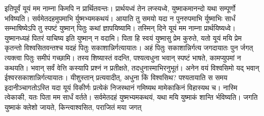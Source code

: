 \vakya इतिपूर्वं यूयं मम नाम्ना किमपि न प्रार्थितवन्तः। प्रार्थयध्वं तेन लप्स्यध्वे, युष्माकमानन्दो यथा सम्पूर्णो भविष्यति।
\vakya सर्वमेतदहमुपमाभि र्युष्मभ्यमकथयं। आयाति तु समयो यदा न पुनरुपमाभि र्युष्माभिः सार्धं सम्भाषिष्येऽपि तु स्पष्टं युष्मान् पितुः कथां ज्ञापयिष्यामि।
\vakya तस्मिन् दिने यूयं मम नाम्ना प्रार्थयिष्यध्वे। युष्मानध्यहं पितरं याचिष्य इति युष्मान् न वदामि।
\vakya पिता हि स्वयं युष्मासु प्रेम कुरुते, यतो यूयं मयि प्रेम कृतन्तो विश्वसितवन्तश्च यदहं पितुः सकाशान्निर्गत्यायातः।
\vakya अहं पितुः सकाशान्निर्गत्य जगदायातः पुन र्जगत् त्यक्त्वा पितुः समीपं गच्छामि।
\vakya तस्य शिष्यास्तं वदन्ति, पश्यत्वधुना भवान् स्पष्टं भाषते, कामप्युपमां न कथयति।
\vakya भवान् सर्वं वेत्ति कस्यापि प्रश्नं न प्रतीक्षते, तदधुनास्माभिरनुभूतं। अनेन वयं विश्वसिमो यद् भवान् ईश्वरसकाशान्निर्गत्यायातः।
\vakya यीशुस्तान् प्रत्यवादीत्, अधुना किं विश्वसिथ?
\vakya पश्यतायाति स समय इदानीञ्चागतोऽस्ति यदा यूयं विकीर्णः प्रत्येकं निजस्थानं गमिष्यथ मामेकाकिनं विहास्यथ च। नास्मि त्वेकाकी, यतः पिता मम सार्धं वर्तते।
\vakya सर्वमेतदहं युष्मभ्यमकथयं, यथा मयि युष्माकं शान्ति र्भविष्यति। जगति युष्माकं क्लेशो जायते, किन्त्वाश्वसित, पराजितं मया जगत्\eoc